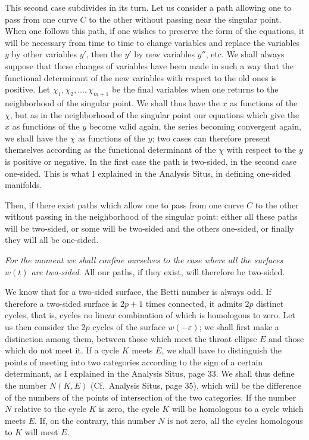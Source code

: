 \documentclass{article}
\begin{document}
This second case subdivides in its turn. Let us consider a path allowing one to pass from one curve $C$ to the other without passing near the singular point. When one follows this path, if one wishes to preserve the form of the equations, it will be necessary from time to time to change variables and replace the variables $y$ by other variables $y'$, then the $y'$ by new variables $y''$, etc. We shall always suppose that these changes of variables have been made in such a way that the functional determinant of the new variables with respect to the old ones is positive. Let $\chi_{1}, \chi_{2}, \ldots, \chi_{m+1}$ be the final variables when one returns to the neighborhood of the singular point. We shall thus have the $x$ as functions of the $\chi$, but as in the neighborhood of the singular point our equations which give the $x$ as functions of the $y$ become valid again, the series becoming convergent again, we shall have the $\chi$ as functions of the $y$; two cases can therefore present themselves according as the functional determinant of the $\chi$ with respect to the $y$ is positive or negative. In the first case the path is two-sided, in the second case one-sided. This is what I explained in the Analysis Situs, in defining one-sided manifolds.


Then, if there exist paths which allow one to pass from one curve $C$ to the other without passing in the neighborhood of the singular point: either all these paths will be two-sided, or some will be two-sided and the others one-sided, or finally they will all be one-sided.

\emph{For the moment we shall confine ourselves to the case where all the surfaces $w(t)$ are two-sided}. All our paths, if they exist, will therefore be two-sided.

We know that for a two-sided surface, the Betti number is always odd. If therefore a two-sided surface is $2p + 1$ times connected, it admits $2p$ distinct cycles, that is, cycles no linear combination of which is homologous to zero. Let us then consider the $2p$ cycles of the surface $w(-\varepsilon)$; we shall first make a distinction among them, between those which meet the throat ellipse $E$ and those which do not meet it. If a cycle $K$ meets $E$, we shall have to distinguish the points of meeting into two categories according to the sign of a certain determinant, as I explained in the Analysis Situs, page 33. We shall thus define the number $N(K, E)$ (Cf.\ Analysis Situs, page 35), which will be the difference of the numbers of the points of intersection of the two categories. If the number $N$ relative to the cycle $K$ is zero, the cycle $K$ will be homologous to a cycle which meets $E$. If, on the contrary, this number $N$ is not zero, all the cycles homologous to $K$ will meet $E$.
\end{document}

